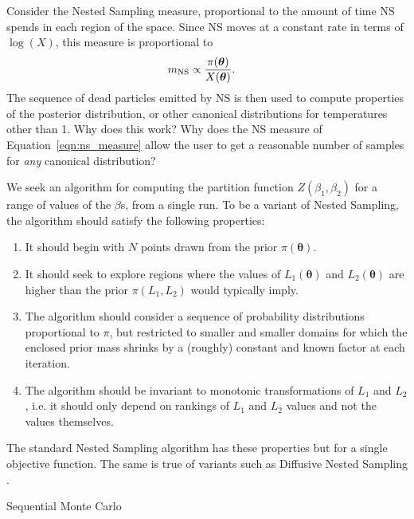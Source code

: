 \documentclass[entropy,article,submit,moreauthors,pdftex,10pt,a4paper]{Definitions/mdpi}
\newcommand{\xx}{\boldsymbol{\theta}}
\begin{document}
Consider the Nested Sampling measure, proportional to the amount of time
NS spends in each region of the space. Since NS moves at a constant rate
in terms of $\log(X)$, this measure is proportional to
\begin{align}
m_{\rm NS} &\propto \frac{\pi(\xx)}{X(\xx)}.\label{eqn:measure}
\end{align}
The sequence of dead particles emitted by NS is then used to compute properties
of the posterior distribution, or other canonical distributions for temperatures
other than 1. Why does this work? Why does the NS measure of
Equation~\ref{eqn:ns_measure} allow the user to get a reasonable number of
samples for {\em any} canonical distribution?






We seek an algorithm for computing the partition function
$Z(\beta_1, \beta_2)$ for a range of values of the $\beta$s, from a single
run. To be a variant of Nested Sampling, the algorithm should satisfy
the following properties:
\begin{enumerate}
\item It should begin with $N$ points drawn from the prior $\pi(\xx)$.
\item It should seek to explore regions where the values of
$L_1(\xx)$ and $L_2(\xx)$ are higher than the prior $\pi(L_1, L_2)$
would typically imply.
\item The algorithm should consider a sequence of probability
distributions proportional to $\pi$, but restricted to smaller and smaller
domains for which the enclosed prior mass shrinks by a (roughly) constant and
known factor at each iteration.
\item The algorithm should be invariant to monotonic transformations of
$L_1$ and $L_2$, i.e. it should only depend on rankings of $L_1$ and $L_2$
values and not the values themselves.
\end{enumerate}
The standard Nested Sampling algorithm has these properties but for a
single objective function. The same is true of variants such as
Diffusive Nested Sampling \citep{dns, dnest4}.


Sequential Monte Carlo \citep{doucet2001introduction, salomone2018unbiased}
\end{document}
